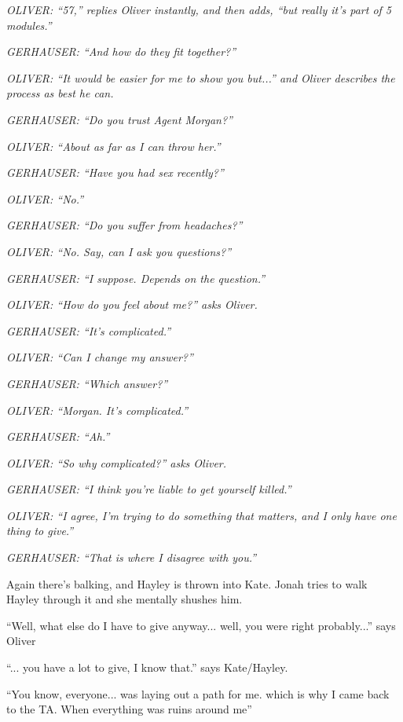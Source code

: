 \textit{OLIVER: ``57,'' replies Oliver instantly, and then adds, ``but really it's part of 5 modules.''}

\textit{GERHAUSER: ``And how do they fit together?''}

\textit{OLIVER: ``It would be easier for me to show you but...'' and Oliver describes the process as best he can.}

\textit{GERHAUSER: ``Do you trust Agent Morgan?''}

\textit{OLIVER: ``About as far as I can throw her.''}

\textit{GERHAUSER: ``Have you had sex recently?''}

\textit{OLIVER: ``No.''}

\textit{GERHAUSER: ``Do you suffer from headaches?''}

\textit{OLIVER: ``No.  Say, can I ask you questions?''}

\textit{GERHAUSER: ``I suppose.  Depends on the question.''}

\textit{OLIVER: ``How do you feel about me?'' asks Oliver.}

\textit{GERHAUSER: ``It's complicated.''}



\textit{OLIVER: ``Can I change my answer?''}

\textit{GERHAUSER: ``Which answer?''}

\textit{OLIVER: ``Morgan.  It's complicated.''}

\textit{GERHAUSER: ``Ah.''}

\textit{OLIVER: ``So why complicated?'' asks Oliver.}

\textit{GERHAUSER: ``I think you're liable to get yourself killed.''}

\textit{OLIVER: ``I agree, I'm trying to do something that matters, and I only have one thing to give.''}

\textit{GERHAUSER: ``That is where I disagree with you.''}

Again there's balking, and Hayley is thrown into Kate.  Jonah tries to walk Hayley through it and she mentally shushes him.  

``Well, what else do I have to give anyway... well, you were right probably...'' says Oliver

``... you have a lot to give, I know that.'' says Kate/Hayley.

``You know, everyone... was laying out a path for me. which is why I came back to the TA.  When everything was ruins around me''

